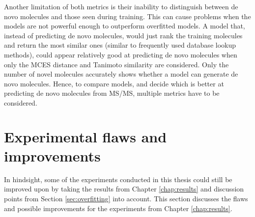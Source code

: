 Another limitation of both metrics is their inability to distinguish between de novo molecules and those seen during training.
This can cause problems when the models are not powerful enough to outperform overfitted models.
A model that, instead of predicting de novo molecules, would just rank the training molecules and return the most similar ones (similar to frequently used database lookup methods), could appear relatively good at predicting de novo molecules when only the \ac{MCES} distance and Tanimoto similarity are considered.
Only the number of novel molecules accurately shows whether a model can generate de novo molecules.
Hence, to compare models, and decide which is better at predicting de novo molecules from \ac{MS/MS}, multiple metrics have to be considered.

\section{Experimental flaws and improvements}

In hindsight, some of the experiments conducted in this thesis could still be improved upon by taking the results from Chapter \ref{chap:results} and discussion points from Section \ref{sec:overfitting} into account.
This section discusses the flaws and possible improvements for the experiments from Chapter \ref{chap:results}.

